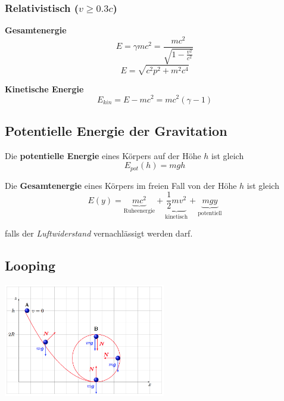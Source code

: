 \documentclass[7pt]{article}
\begin{document}
\begin{multicols*}{3}
\subsubsection{Relativistisch ($v \geq 0.3c$)}

\textbf{Gesamtenergie}
\begin{equation*}
	E = \gamma mc^2 = \frac{mc^2}{\sqrt{1-\frac{v^2}{c^2}}}
\end{equation*}
\begin{equation}
	E=\sqrt{c^2p^2+m^2c^4}
\end{equation}

\textbf{Kinetische Energie}
\begin{equation*}
	E_{kin} = E - mc^2 = mc^2(\gamma - 1)
\end{equation*}

\subsection{Potentielle Energie der Gravitation}

Die \textbf{potentielle Energie} eines K{\"o}rpers auf der H{\"o}he $h$ ist gleich
\begin{equation*}
	E_{pot}(h) = mgh
\end{equation*}

Die \textbf{Gesamtenergie} eines K{\"o}rpers im freien Fall von der H{\"o}he $h$ ist gleich
\begin{equation*}
	E(y) = \underbrace{mc^2}_\text{Ruheenergie} + \underbrace{\frac{1}{2}mv^2}_\text{kinetisch} + \underbrace{mgy}_\text{potentiell}
\end{equation*}

falls der \emph{Luftwiderstand} vernachl{\"a}ssigt werden darf.

\subsection{Looping}

\begin{center}
	\includegraphics[width=200pt]{images/looping}
\end{center}


\end{multicols*}
\end{document}
